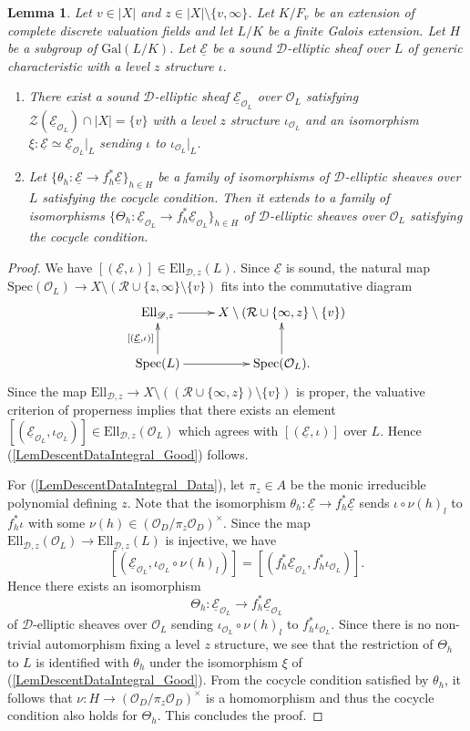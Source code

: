 \documentclass[10pt]{amsart}
\theoremstyle{plain}
\newtheorem{lem}[thm]{Lemma}
\theoremstyle{definition}
\newcommand{\Gal}{\mathrm{Gal}}
\newcommand{\Spec}{\mathrm{Spec}}
\newcommand{\cO}{\mathcal{O}}
\newcommand{\cR}{\mathcal{R}}
\newcommand{\cZ}{\mathcal{Z}}
\newcommand{\Ell}{\mathrm{Ell}}
\newcommand{\ucE}{\underline{\mathcal{E}}}
\newcommand{\sD}{\mathscr{D}}
\begin{document}
\begin{lem}\label{LemDescentDataIntegral}
	Let $v\in |X|$ and $z\in |X|\setminus\{v,\infty\}$.
	Let $K/F_v$ be an extension of complete discrete valuation fields and let $L/K$ be a finite Galois extension.
	Let $H$ be a subgroup of $\Gal(L/K)$.
	Let $\ucE$ be a sound $\sD$-elliptic sheaf over $L$ of generic characteristic with a level $z$ structure $\iota$.
	\begin{enumerate}
		\item\label{LemDescentDataIntegral_Good} There exist a sound $\sD$-elliptic sheaf $\ucE_{\cO_L}$ over $\cO_L$ satisfying
		$\cZ(\ucE_{\cO_L})\cap|X|=\{v\}$ with a level $z$ structure $\iota_{\cO_L}$
		and an isomorphism $\xi:\ucE\simeq \ucE_{\cO_L}|_L$ sending $\iota$ to $\iota_{\cO_L}|_L$.
		\item\label{LemDescentDataIntegral_Data}  Let $\{\theta_h:\ucE\to f_h^*\ucE\}_{h\in H}$ be a family of isomorphisms of $\sD$-elliptic sheaves 
		over $L$ satisfying the cocycle condition.
		Then it extends to a family of isomorphisms $\{\Theta_h:\ucE_{\cO_L}\to f_h^*\ucE_{\cO_L}\}_{h\in H}$ 
		of $\sD$-elliptic sheaves 
		over $\cO_L$ satisfying the cocycle condition.
	\end{enumerate}
\end{lem}
\begin{proof}
	We have $[(\ucE,\iota)]\in \Ell_{\sD,z}(L)$.
	Since $\ucE$ is sound, the natural map $\Spec(\cO_{L})\to X\setminus (\cR\cup\{z,\infty\}\setminus\{v\})$ fits into the commutative diagram
	\[
	\xymatrix{
		\Ell_{\sD,z} \ar[r] & X\setminus(\cR\cup\{\infty,z\}\setminus\{v\})\\
		\Spec(L)\ar[r]\ar[u]^{[(\ucE,\iota)]}& \Spec(\cO_{L}).\ar[u]
	}
	\]
	Since the map $\Ell_{\sD,z}\to X\setminus ((\cR\cup \{\infty,z\})\setminus \{v\})$ is proper,
	the valuative criterion of properness implies that 
	there exists an element $[(\ucE_{\cO_L},\iota_{\cO_L})]\in \Ell_{\sD,z}(\cO_L)$ which agrees with
	$[(\ucE,\iota)]$ over $L$. Hence (\ref{LemDescentDataIntegral_Good}) follows.
	
	For (\ref{LemDescentDataIntegral_Data}), let $\pi_z\in A$ be the monic irreducible polynomial defining $z$.
	Note that the isomorphism $\theta_h:\ucE\to f_h^* \ucE$ sends $\iota\circ \nu(h)^{}_l$ to $f_h^*\iota$ 
	with some $\nu(h)\in (\cO_D/\pi_z\cO_D)^\times$. 
	Since the map $\Ell_{\sD,z}(\cO_L)\to \Ell_{\sD,z}(L)$ is 
	injective, we have
	\[
	[(\ucE_{\cO_L},\iota_{\cO_L}\circ \nu(h)^{}_l)]=[(f_h^*\ucE_{\cO_L},f_h^*\iota_{\cO_L})].
	\]
	Hence there exists an isomorphism 
	\[
	\Theta_h: \ucE_{\cO_L}\to f_h^*\ucE_{\cO_L}
	\]
	of $\sD$-elliptic sheaves over $\cO_L$ sending $\iota_{\cO_L}\circ \nu(h)^{}_l$ to $f_h^*\iota_{\cO_L}$.
	Since there is no non-trivial automorphism fixing a level $z$ structure, we see that the restriction of $\Theta_h$ to $L$
	is identified with $\theta_h$ under the isomorphism $\xi$ of (\ref{LemDescentDataIntegral_Good}). 
	From the cocycle condition satisfied by $\theta_h$, it follows that 
	$\nu:H\to (\cO_D/\pi_z\cO_D)^\times$ is a homomorphism and thus the cocycle condition also holds for $\Theta_h$. This concludes the proof.
\end{proof}
\end{document}
